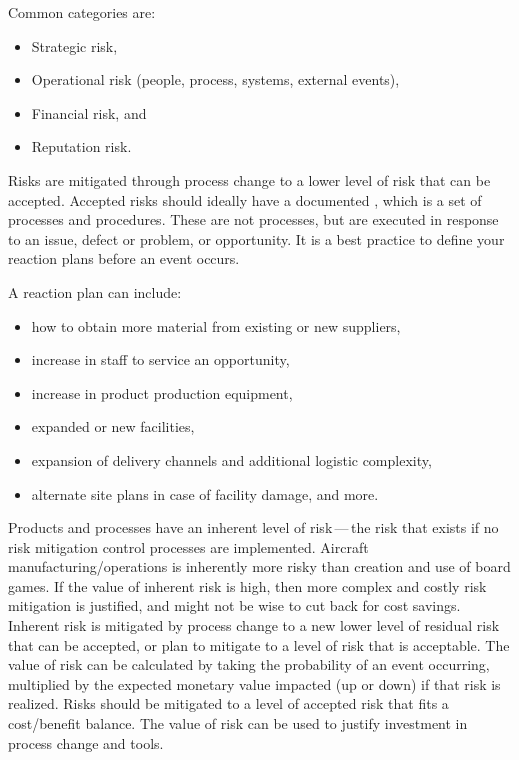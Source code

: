Common categories are:
\begin{itemize}
    \item Strategic risk,
    \item Operational risk (people, process, systems, external events),
    \item Financial risk, and
    \item Reputation risk.
\end{itemize}

Risks are mitigated through process change to a lower level of risk that can be accepted.
Accepted risks should ideally have a documented , which is a set of processes and procedures.
These are not  processes, but are executed in response to an issue, defect or problem, or opportunity.
It is a best practice to define your reaction plans before an event occurs.

A reaction plan can include:
\begin{itemize}
    \item how to obtain more material from existing or new suppliers,
    \item increase in staff to service an opportunity,
    \item increase in product production equipment,
    \item expanded or new facilities,
    \item expansion of delivery channels and additional logistic complexity,
    \item alternate site plans in case of facility damage, and more.
\end{itemize}

Products and processes have an inherent level of risk\,---\,the risk that exists if no risk mitigation control
processes are implemented.
Aircraft manufacturing/operations is inherently more risky than creation and use of board games.
If the value of inherent risk is high, then more complex and costly risk mitigation is justified,
and might not be wise to cut back for cost savings.
Inherent risk is mitigated by process change to a new lower level of residual risk that can be accepted,
or plan to mitigate to a level of risk that is acceptable.
The value of risk can be calculated by taking the probability of an event occurring,
multiplied by the expected monetary value impacted (up or down) if that risk is realized.
Risks should be mitigated to a level of accepted risk that fits a cost/benefit balance.
The value of risk can be used to justify investment in process change and tools.

